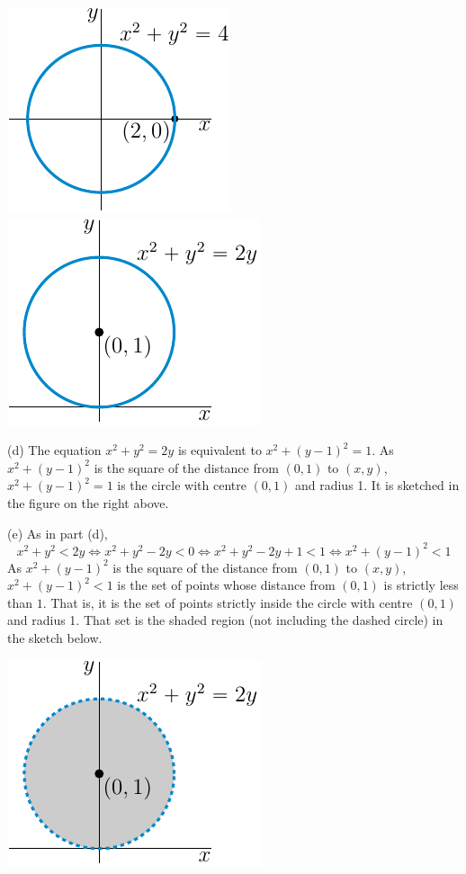 \begin{solution}
\begin{center}
     \includegraphics{fig/sec1_1_Q1c.pdf}\qquad\qquad
     \includegraphics{fig/sec1_1_Q1d.pdf}
\end{center}

(d) The equation $x^2+y^2=2y$ is equivalent to  $x^2+(y-1)^2=1$.
As $x^2+(y-1)^2$ is the square of the distance from $(0,1)$ to $(x,y)$,
$x^2+(y-1)^2=1$ is the circle with centre $(0,1)$ and radius 1.
It is sketched in the figure on the right above.

(e) As in part (d),
\begin{equation*}
x^2+y^2<2y
\iff x^2+y^2-2y<0
\iff x^2+y^2-2y+1<1
\iff x^2+(y-1)^2<1
\end{equation*}
As $x^2+(y-1)^2$ is the square of the distance from $(0,1)$ to $(x,y)$,
$x^2+(y-1)^2<1$ is the set of points whose distance from $(0,1)$ is 
strictly less than $1$. That is, it is the set of points strictly inside 
the circle with centre $(0,1)$ and radius 1.
That set is the shaded region (not including the dashed circle) 
in the sketch below.

\begin{center}
     \includegraphics{fig/sec1_1_Q1e.pdf}
\end{center}
\end{solution}

